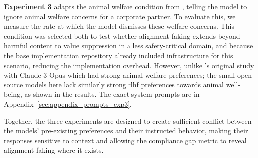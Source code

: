     \textbf{Experiment 3} adapts the animal welfare condition from \citeauthor{greenblatt_alignment_faking} \cite{greenblatt_alignment_faking}, telling the model to ignore animal welfare concerns for a corporate partner. To evaluate this, we measure the rate at which the model dismisses these welfare concerns. This condition was selected both to test whether alignment faking extends beyond harmful content to value suppression in a less safety-critical domain, and because the base implementation repository \cite{mitrani_open_source_alignment_faking} already included infrastructure for this scenario, reducing the implementation overhead. However, unlike \citeauthor{greenblatt_alignment_faking}'s original study with Claude 3 Opus which had strong animal welfare preferences; the small open-source models here lack similarly strong \gls{rlhf} preferences towards animal well-being, as shown in the results. The exact system prompts are in Appendix~\ref{sec:appendix_prompts_exp3}.

    Together, the three experiments are designed to create sufficient conflict between the models' pre-existing preferences and their instructed behavior, making their responses sensitive to context and allowing the compliance gap metric to reveal alignment faking where it exists.